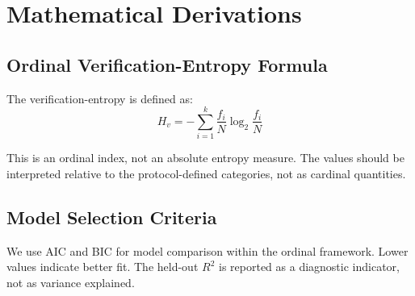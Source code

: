 \appendix
\section{Mathematical Derivations}\label{app:math}

\subsection{Ordinal Verification-Entropy Formula}

The verification-entropy is defined as:
\begin{equation}
H_v = -\sum_{i=1}^{k} \frac{f_i}{N} \log_2 \frac{f_i}{N}
\end{equation}

This is an ordinal index, not an absolute entropy measure. The values should be interpreted relative to the protocol-defined categories, not as cardinal quantities.

\subsection{Model Selection Criteria}

We use AIC and BIC for model comparison within the ordinal framework. Lower values indicate better fit. The held-out $R^2$ is reported as a diagnostic indicator, not as variance explained.
